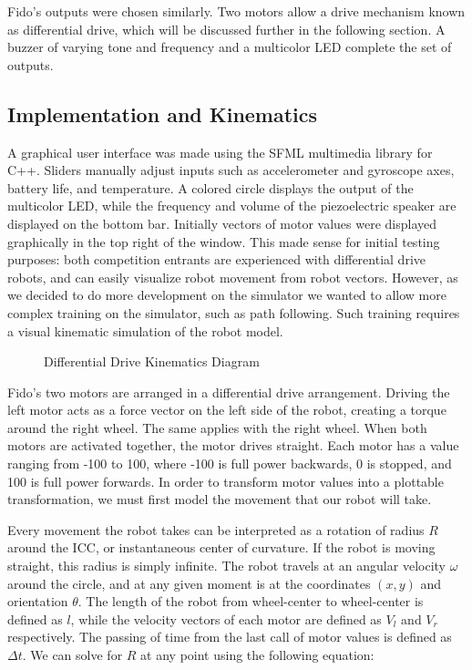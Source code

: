 Fido's outputs were chosen similarly.  Two motors allow a drive mechanism known as differential drive, which will be discussed further in the following section.  A buzzer of varying tone and frequency and a multicolor LED complete the set of outputs.  

\subsection{Implementation and Kinematics}

A graphical user interface was made using the SFML multimedia library for C++.  Sliders manually adjust inputs such as accelerometer and gyroscope axes, battery life, and temperature.  A colored circle displays the output of the multicolor LED, while the frequency and volume of the piezoelectric speaker are displayed on the bottom bar.   Initially vectors of motor values were displayed graphically in the top right of the window.  This made sense for initial testing purposes: both competition entrants are experienced with differential drive robots, and can easily visualize robot movement from robot vectors.  However, as we decided to do more development on the simulator we wanted to allow more complex training on the simulator, such as path following.  Such training requires a visual kinematic simulation of the robot model.

\begin{figure}[ht]
	\centering
	
	\caption{Differential Drive Kinematics Diagram}
\end{figure}

Fido's two motors are arranged in a differential drive arrangement.  Driving the left motor acts as a force vector on the left side of the robot, creating a torque around the right wheel.  The same applies with the right wheel.  When both motors are activated together, the motor drives straight.  Each motor has a value ranging from -100 to 100, where -100 is full power backwards, 0 is stopped, and 100 is full power forwards.   In order to transform motor values into a plottable transformation, we must first model the movement that our robot will take.

Every movement the robot takes can be interpreted as a rotation of radius $R$ around the ICC, or instantaneous center of curvature.  If the robot is moving straight, this radius is simply infinite.   The robot travels at an angular velocity $\omega$ around the circle, and at any given moment is at the coordinates $(x,y)$ and orientation $\theta$.  The length of the robot from wheel-center to wheel-center is defined as $l$, while the velocity vectors of each motor are defined as $V_l$ and $V_r$ respectively.  The passing of time from the last call of motor values is defined as $\Delta t$.  We can solve for $R$ at any point using the following equation:

